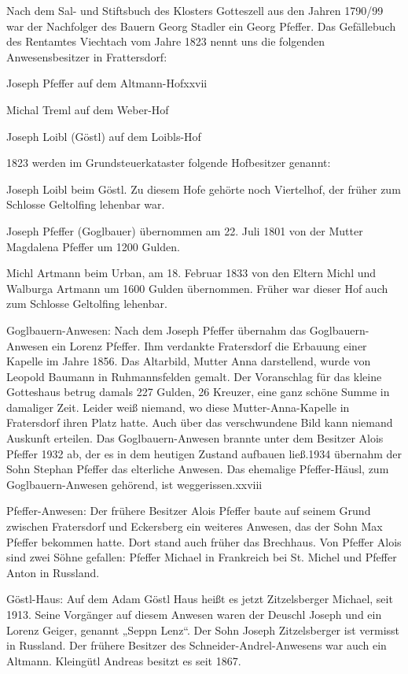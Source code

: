 Nach dem Sal- und Stiftsbuch des Klosters Gotteszell aus den Jahren 1790/99 war
der Nachfolger des Bauern Georg Stadler ein Georg Pfeffer. Das Gefällebuch des
Rentamtes Viechtach vom Jahre 1823 nennt uns die folgenden Anwesensbesitzer in
Frattersdorf:



Joseph Pfeffer auf dem Altmann-Hofxxvii

Michal Treml auf dem Weber-Hof

Joseph Loibl (Göstl) auf dem Loibls-Hof



1823 werden im Grundsteuerkataster folgende Hofbesitzer genannt:



Joseph Loibl beim Göstl. Zu diesem Hofe gehörte noch Viertelhof, der früher zum
Schlosse Geltolfing lehenbar war.

Joseph Pfeffer (Goglbauer) übernommen am 22. Juli 1801 von der Mutter Magdalena
Pfeffer um 1200 Gulden.

Michl Artmann beim Urban, am 18. Februar 1833 von den Eltern Michl und Walburga
Artmann um 1600 Gulden übernommen. Früher war dieser Hof auch zum Schlosse
Geltolfing lehenbar.



Goglbauern-Anwesen: Nach dem Joseph Pfeffer übernahm das Goglbauern-Anwesen ein
Lorenz Pfeffer. Ihm verdankte Fratersdorf die Erbauung einer Kapelle im Jahre
1856. Das Altarbild, Mutter Anna darstellend, wurde von Leopold Baumann in
Ruhmannsfelden gemalt. Der Voranschlag für das kleine Gotteshaus betrug damals
227 Gulden, 26 Kreuzer, eine ganz schöne Summe in damaliger Zeit. Leider weiß
niemand, wo diese Mutter-Anna-Kapelle in Fratersdorf ihren Platz hatte. Auch
über das verschwundene Bild kann niemand Auskunft erteilen. Das
Goglbauern-Anwesen brannte unter dem Besitzer Alois Pfeffer 1932 ab, der es in
dem heutigen Zustand aufbauen ließ.1934 übernahm der Sohn Stephan Pfeffer das
elterliche Anwesen. Das ehemalige Pfeffer-Häusl, zum Goglbauern-Anwesen
gehörend, ist weggerissen.xxviii

Pfeffer-Anwesen: Der frühere Besitzer Alois Pfeffer baute auf seinem Grund
zwischen Fratersdorf und Eckersberg ein weiteres Anwesen, das der Sohn Max
Pfeffer bekommen hatte. Dort stand auch früher das Brechhaus. Von Pfeffer Alois
sind zwei Söhne gefallen: Pfeffer Michael in Frankreich bei St. Michel und
Pfeffer Anton in Russland.

Göstl-Haus: Auf dem Adam Göstl Haus heißt es jetzt Zitzelsberger Michael, seit
1913. Seine Vorgänger auf diesem Anwesen waren der Deuschl Joseph und ein Lorenz
Geiger, genannt „Seppn Lenz“. Der Sohn Joseph Zitzelsberger ist vermisst in
Russland. Der frühere Besitzer des Schneider-Andrel-Anwesens war auch ein
Altmann. Kleingütl Andreas besitzt es seit 1867.

